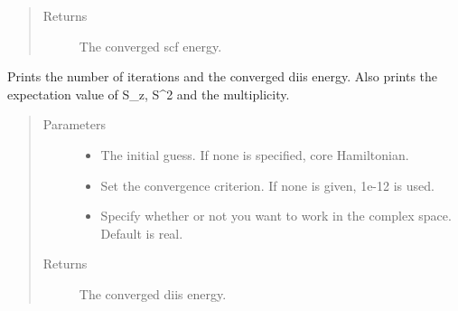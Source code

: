\documentclass[letterpaper,10pt,english]{sphinxmanual}
\begin{document}
\begin{fulllineitems}
\begin{fulllineitems}
\begin{quote}
\begin{description}
\begin{itemize}
\end{itemize}

\item[{Returns}] \leavevmode
The converged scf energy.

\end{description}\end{quote}

\end{fulllineitems}


\begin{fulllineitems}
\label{\detokenize{UHF:hf.HartreeFock.UHF.MF.get_scf_solution_diis}}
Prints the number of iterations and the converged diis energy.
Also prints the expectation value of S\_z, S\textasciicircum{}2 and the multiplicity.
\begin{quote}\begin{description}
\item[{Parameters}] \leavevmode\begin{itemize}
\item {} 
 \textendash{} The initial guess. If none is specified, core Hamiltonian.

\item {} 
 \textendash{} Set the convergence criterion. If none is given, 1e-12 is used.

\item {} 
 \textendash{} Specify whether or not you want to work in the complex space. Default is real.

\end{itemize}

\item[{Returns}] \leavevmode
The converged diis energy.

\end{description}\end{quote}

\end{fulllineitems}



\end{fulllineitems}
\end{document}
